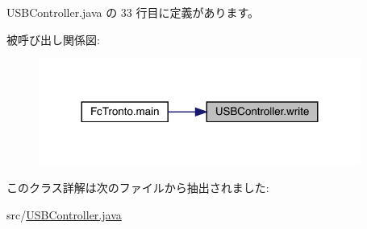  U\+S\+B\+Controller.\+java の 33 行目に定義があります。

被呼び出し関係図\+:
\nopagebreak
\begin{figure}[H]
\begin{center}
\leavevmode
\includegraphics[width=299pt]{db/d49/class_u_s_b_controller_afe8a9c9fdb005132410e327153c984f4_icgraph}
\end{center}
\end{figure}


このクラス詳解は次のファイルから抽出されました\+:\begin{DoxyCompactItemize}
\item 
src/\mbox{\hyperlink{_u_s_b_controller_8java}{U\+S\+B\+Controller.\+java}}\end{DoxyCompactItemize}

